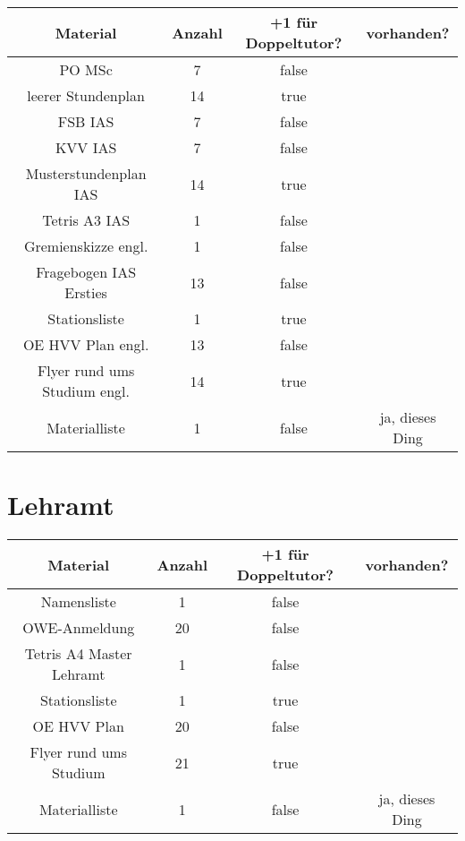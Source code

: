 \documentclass[10pt,a4paper,oneside,ngerman,numbers=noenddot]{scrartcl}
\begin{document}
	\begin{tabular}{c|c|c|c}
		\textbf{Material} & \textbf{Anzahl} & \textbf{+1 für Doppeltutor?} & \textbf{vorhanden?} \\
		\hline
		PO MSc & 7 & false & \\
		\hline
		leerer Stundenplan & 14 & true & \\
		\hline
		FSB IAS & 7 & false & \\
		\hline
		KVV IAS & 7 & false & \\
		\hline
		Musterstundenplan IAS & 14 & true & \\
		\hline
		Tetris A3 IAS & 1 & false & \\
		\hline
		Gremienskizze engl. & 1 & false & \\
		\hline
		Fragebogen IAS Ersties & 13 & false & \\
		\hline
		Stationsliste & 1 & true & \\
		\hline
		OE HVV Plan engl. & 13 & false & \\
		\hline
		Flyer rund ums Studium engl. & 14 & true & \\
		\hline
		Materialliste & 1 & false & ja, dieses Ding \\
	\end{tabular}

\section{Lehramt}

	\begin{tabular}{c|c|c|c}
		\textbf{Material} & \textbf{Anzahl} & \textbf{+1 für Doppeltutor?} & \textbf{vorhanden?} \\
		\hline
		Namensliste & 1 & false & \\
		\hline
		OWE-Anmeldung & 20 & false & \\
		\hline
		Tetris A4 Master Lehramt & 1 & false & \\
		\hline
		Stationsliste & 1 & true & \\
		\hline
		OE HVV Plan & 20 & false & \\
		\hline
		Flyer rund ums Studium & 21 & true & \\
		\hline
		Materialliste & 1 & false & ja, dieses Ding \\
	\end{tabular}
\end{document}

